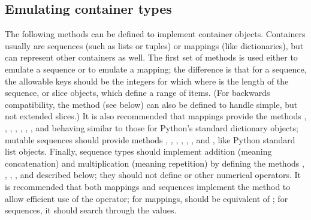 \subsection{Emulating container types\label{sequence-types}}

The following methods can be defined to implement container
objects.  Containers usually are sequences (such as lists or tuples)
or mappings (like dictionaries), but can represent other containers as
well.  The first set of methods is used either to emulate a
sequence or to emulate a mapping; the difference is that for a
sequence, the allowable keys should be the integers  for which
 where  is the length of the
sequence, or slice objects, which define a range of items. (For backwards
compatibility, the method  (see below) can also be
defined to handle simple, but not extended slices.) It is also recommended
that mappings provide the methods , ,
, , , ,
, and  behaving similar to those for
Python's standard dictionary objects; mutable sequences should provide
methods , , ,
, , , 
and , like Python standard list objects.  Finally,
sequence types should implement addition (meaning concatenation) and
multiplication (meaning repetition) by defining the methods
, , ,
,  and  described
below; they should not define  or other numerical
operators.  It is recommended that both mappings and sequences
implement the  method to allow efficient use of
the  operator; for mappings,  should be equivalent
of ; for sequences, it should search through the
values.

